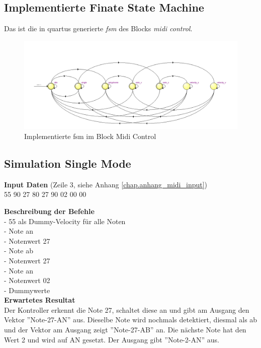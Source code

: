 \subsection{Implementierte Finate State Machine}
Das ist die in quartus generierte \textit{fsm} des Blocks \textit{midi control}.
\begin{figure}[H]
	\centering
	\includegraphics[width=1\textwidth]{images/midi_control/fsm_midicontrol.png}
	\caption{Implementierte fsm im Block Midi Control}
	\label{fig.midi_fsm_quartus_}
\end{figure}


\subsection{Simulation Single Mode}

\textbf{Input Daten} (Zeile 3, siehe Anhang \ref{chap.anhang_midi_input})\\
55 90 27 80 27 90 02 00 00

\textbf{Beschreibung der Befehle}\\
- 55 als Dummy-Velocity für alle Noten\\
- Note an\\
- Notenwert 27\\
- Note ab\\
- Notenwert 27\\
- Note an\\
- Notenwert 02\\
- Dummywerte\\

\textbf{Erwartetes Resultat}\\
Der Kontroller erkennt die Note 27, schaltet diese an und gibt am Ausgang den Vektor ''Note-27-AN'' aus. Dieselbe Note wird nochmals detektiert, diesmal als ab und der Vektor am Ausgang zeigt ''Note-27-AB'' an. Die nächste Note hat den Wert 2 und wird auf AN gesetzt. Der Ausgang gibt ''Note-2-AN'' aus.\\


